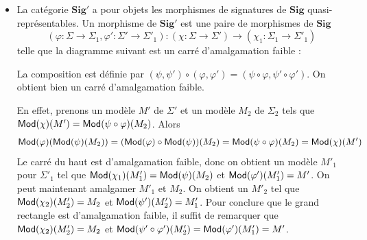 \documentclass[11pt,a4paper]{report}
\newcommand{\ph}{\varphi}
\newcommand{\itemz}{\item[$\triangleright$]}
\newcommand{\gr}{\textbf}
\newcommand{\info}[1]{\text{{\fontfamily{lmss}\selectfont #1}}}
\newcommand{\Mod}{\info{Mod}}
\newcommand{\1}{\mathbbm{1}}
\begin{document}
\begin{itemize}
\itemz La catégorie $\gr{Sig}'$ a pour objets les morphismes de signatures de $\gr{Sig}$ quasi-représentables. Un morphisme de $\gr{Sig}'$ est une paire de morphismes de $\gr{Sig}$
\[ (\ph : \Sigma \to \Sigma_1, \ph' : \Sigma' \to \Sigma'_1) : (\chi : \Sigma \to \Sigma') \to (\chi_1 : \Sigma_1 \to \Sigma'_1) \] telle que la diagramme suivant est un carré d'amalgamation faible :
\begin{center}
\end{center}
La composition est définie par $(\psi,\psi') \circ (\ph,\ph') = (\psi \circ \ph , \psi' \circ \ph')$. On obtient bien un carré d'amalgamation faible.
\begin{center}
\end{center}
En effet, prenons un modèle $M'$ de $\Sigma'$ et un modèle  $M_2$ de $\Sigma_2$ tels que $\Mod(\chi)(M') = \Mod(\psi \circ \ph)(M_2)$. Alors
\[ \Mod(\ph) (\Mod(\psi)(M_2)) = (\Mod(\ph) \circ \Mod(\psi))(M_2) = \Mod(\psi \circ \ph)(M_2) = \Mod(\chi)(M') \]
Le carré du haut est d'amalgamation faible, donc on obtient un modèle $M'_1$ pour $\Sigma'_1$ tel que $\Mod(\chi_1)(M'_1) = \Mod(\psi)(M_2)$ et $\Mod(\ph')(M'_1) = M'$. On peut maintenant amalgamer $M'_1$ et $M_2$. On obtient un $M'_2$ tel que $\Mod(\chi_2)(M'_2) = M_2$ et $\Mod(\psi')(M'_2) = M'_1$. Pour conclure que le grand rectangle est d'amalgamation faible, il suffit de remarquer que $\Mod(\chi_2)(M'_2) = M_2$ et $\Mod(\psi'\circ\ph')(M'_2) = \Mod(\ph')(M'_1) = M'$.\\\\

\end{itemize}
\end{document}
